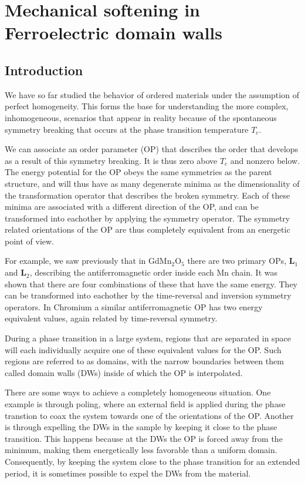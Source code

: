 \chapter{Mechanical softening in Ferroelectric domain walls \label{ch:Softening}}


\section{Introduction}
We have so far studied the behavior of ordered materials under the assumption of perfect homogeneity.
This forms the base for understanding the more complex, inhomogeneous, scenarios that appear in reality because of the spontaneous symmetry breaking that occurs at the phase transition temperature $T_c$.

We can associate an order parameter (OP) that describes the order that develops as a result of this symmetry breaking. It is thus zero above $T_c$ and nonzero below.
The energy potential for the OP obeys the same symmetries as the parent structure, and will thus have as many degenerate minima as the dimensionality of the transformation operator that describes the broken symmetry.
Each of these minima are associated with a different direction of the OP, and can be transformed into eachother by applying the symmetry operator. 
The symmetry related orientations of the OP are thus completely equivalent from an energetic point of view.

For example, we saw previously that in GdMn$_2$O$_5$ there are two primary OPs, $\bm{L}_1$ and $\bm{L}_2$, describing the antiferromagnetic order inside each Mn chain.
It was shown that there are four combinations of these that have the same energy. They can be transformed into eachother by the time-reversal and inversion symmetry operators. 
In Chromium a similar antiferromagnetic OP has two energy equivalent values, again related by time-reversal symmetry.

During a phase transition in a large system, regions that are separated in space will each individually acquire one of these equivalent values for the OP.
Such regions are referred to as domains, with the narrow boundaries between them called domain walls (DWs) inside of which the OP is interpolated.

There are some ways to achieve a completely homogeneous situation. One example is through poling, where an external field is applied during the phase transtion to coax the system towards one of the orientations of the OP.
Another is through expelling the DWs in the sample by keeping it close to the phase transition.
This happens because at the DWs the OP is forced away from the minimum, making them energetically less favorable than a uniform domain.
Consequently, by keeping the system close to the phase transition for an extended period, it is sometimes possible to expel the DWs from the material.

